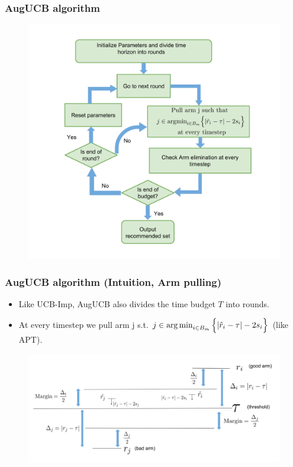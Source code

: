 \begin{frame}
\frametitle{AugUCB algorithm}
\begin{figure}
\includegraphics[scale=0.24]{img/AugUCB_flow.png}
\end{figure}
\end{frame}



\begin{frame}
\frametitle{AugUCB algorithm (Intuition, Arm pulling)}
\begin{itemize}
\item Like UCB-Imp, AugUCB also divides the time budget $T$ into rounds.
\item At every timestep we pull arm j s.t. $j\in\operatorname*{arg\,min}_{i\in B_{m}}\Big\lbrace |\hat{r}_{i} - \tau | - 2s_{i}\Big\rbrace$ (like APT). 
\end{itemize}

\begin{figure}
\includegraphics[scale=0.278]{img/SeminarThresholdBandit.png}
\end{figure}
\end{frame}

